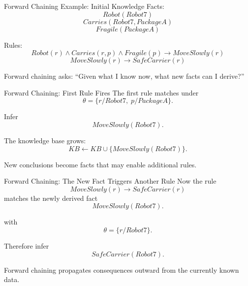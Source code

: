 \documentclass[aspectratio=169,10pt]{beamer}
\begin{document}
\begin{frame}[shrink=10]{Forward Chaining Example: Initial Knowledge}
  Facts:
  \[
    Robot(Robot7)
  \]
  \[
    Carries(Robot7,PackageA)
  \]
  \[
    Fragile(PackageA)
  \]

  Rules:
  \[
    Robot(r)\land Carries(r,p)\land Fragile(p)
    \rightarrow MoveSlowly(r)
  \]
  \[
    MoveSlowly(r) \rightarrow SafeCarrier(r)
  \]

  \begin{keyidea}
    Forward chaining asks: ``Given what I know now, what new facts can I derive?''
  \end{keyidea}
\end{frame}

\begin{frame}[shrink=10]{Forward Chaining: First Rule Fires}
  The first rule matches under
  \[
    \theta=\{r/Robot7,\;p/PackageA\}.
  \]

  Infer
  \[
    MoveSlowly(Robot7).
  \]

  The knowledge base grows:
  \[
    KB \leftarrow KB \cup \{MoveSlowly(Robot7)\}.
  \]

  \begin{keyidea}
    New conclusions become facts that may enable additional rules.
  \end{keyidea}
\end{frame}

\begin{frame}[shrink=10]{Forward Chaining: The New Fact Triggers Another Rule}
  Now the rule
  \[
    MoveSlowly(r) \rightarrow SafeCarrier(r)
  \]
  matches the newly derived fact
  \[
    MoveSlowly(Robot7).
  \]

  with
  \[
    \theta=\{r/Robot7\}.
  \]

  Therefore infer
  \[
    SafeCarrier(Robot7).
  \]

  \begin{keyidea}
    Forward chaining propagates consequences outward from the currently known data.
  \end{keyidea}
\end{frame}
\end{document}
